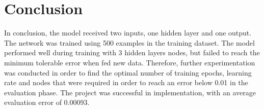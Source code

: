 \section*{Conclusion}
In conclusion, the model received two inputs, one hidden layer and one output. The network was trained using 500 examples in the training dataset. The model performed well during training with 3 hidden layers nodes, but failed to reach the minimum tolerable error when fed new data. Therefore, further experimentation was conducted in order to find the optimal number of training epochs, learning rate and nodes that were required in order to reach an error below 0.01 in the evaluation phase. The project was successful in implementation, with an average evaluation error of 0.00093.
